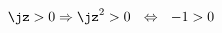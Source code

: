 \begin{alignat}{2}
  \jz > 0    \Rightarrow    \jz^2 > 0    ~~\Leftrightarrow~~    -1
  > 0
\end{alignat}


